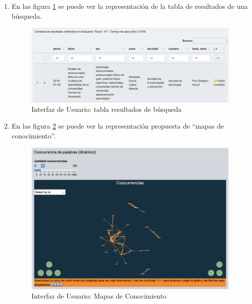\documentclass[
  12pt,
  openany]{book}
\begin{document}
\begin{enumerate}
  \begin{enumerate}
  \def\labelenumii{\arabic{enumii}.}
  \item
    En las figura \ref{fig:tablaresultados2} se puede ver la representación de la tabla de resultados de una búsqueda.

    \begin{figure}

    {\centering \includegraphics[width=0.9\linewidth]{images/05-desarrollo/4_ciclo/UI/tablaresultado} 

    }

    \caption{Interfaz de Usuario: tabla resultados de búsqueda}\label{fig:tablaresultados2}
    \end{figure}
  \item
    En las figura \ref{fig:tablaresultados3} se puede ver la representación propuesta de ``mapas de conocimiento''.

    \begin{figure}

    {\centering \includegraphics[width=0.7\linewidth]{images/05-desarrollo/4_ciclo/UI/uimapas} 

    }

    \caption{Interfaz de Usuario: Mapas de Conocimiento}\label{fig:tablaresultados3}
    \end{figure}
  \end{enumerate}
\end{enumerate}
\end{document}
